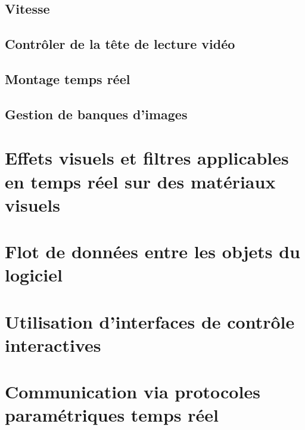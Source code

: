 \documentclass[
  french,
]{book}
\begin{document}
\hypertarget{vitesse}{%
\subsection{Vitesse}\label{vitesse}}

\hypertarget{contruxf4ler-de-la-tuxeate-de-lecture-viduxe9o}{%
\subsection{Contrôler de la tête de lecture vidéo}\label{contruxf4ler-de-la-tuxeate-de-lecture-viduxe9o}}

\hypertarget{montage-temps-ruxe9el}{%
\subsection{Montage temps réel}\label{montage-temps-ruxe9el}}

\hypertarget{gestion-de-banques-dimages}{%
\subsection{Gestion de banques d'images}\label{gestion-de-banques-dimages}}

\hypertarget{effets-visuels-et-filtres-applicables-en-temps-ruxe9el-sur-des-matuxe9riaux-visuels}{%
\section{Effets visuels et filtres applicables en temps réel sur des matériaux visuels}\label{effets-visuels-et-filtres-applicables-en-temps-ruxe9el-sur-des-matuxe9riaux-visuels}}

\hypertarget{flot-de-donnuxe9es-entre-les-objets-du-logiciel}{%
\section{Flot de données entre les objets du logiciel}\label{flot-de-donnuxe9es-entre-les-objets-du-logiciel}}

\hypertarget{interagir_interfaces}{%
\section{Utilisation d'interfaces de contrôle interactives}\label{interagir_interfaces}}

\hypertarget{interagir_protocoles}{%
\section{Communication via protocoles paramétriques temps réel}\label{interagir_protocoles}}
\end{document}
